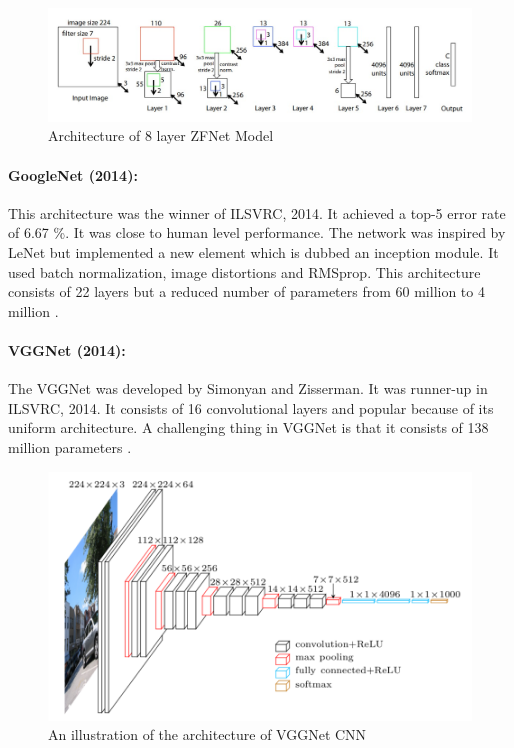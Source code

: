 \begin{figure}[H]
	\centering
	\captionsetup{justification=centering,margin=2cm}
	\includegraphics[scale = 0.6]{CHAPTERS/Chapter-2/Images/2.9.jpg}
	\caption{Architecture of 8 layer ZFNet Model}
	\label{fig:2.9}
\end{figure}

\paragraph*{GoogleNet (2014):}
This architecture was the winner of  ILSVRC, 2014. It achieved a top-5 
error rate of 6.67 \%. It was close to human level performance. The network 
was inspired by LeNet but implemented a new element which is dubbed an 
inception module. It used batch normalization, image distortions and RMSprop. This architecture consists of 22 layers but a 
reduced number of parameters from 60 million to 4 million \cite{chap_2_article:12}. 

\paragraph*{VGGNet (2014):}
The VGGNet was developed by Simonyan and Zisserman. It was 
runner-up in ILSVRC, 2014. It consists of 16 convolutional 
layers and popular because of its uniform architecture. A challenging thing in 
VGGNet is that it consists of 138 million parameters \cite{chap_2_article:13}.
\begin{figure}[H]
	\centering
	\captionsetup{justification=centering,margin=2cm}
	\includegraphics[scale = 0.6]{CHAPTERS/Chapter-2/Images/2.11.png}
	\caption{An illustration of the architecture of VGGNet CNN}
	\label{fig:2.10}
\end{figure}

